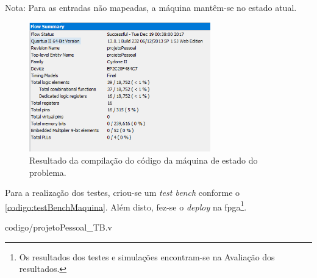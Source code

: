 		
		Nota: Para as entradas não mapeadas, a máquina mantêm-se no estado atual.

		\begin{figure}[H]
			 \centering
			 \caption{\label{figura:compilacaoMaquina}Resultado da compilação do código da máquina de
			  estado do problema.}
			 \includegraphics[width=0.7\textwidth]{img/compilacao}
		\end{figure}

		Para a realização dos testes, criou-se um \textit{test bench} conforme o \autoref{codigo:testBenchMaquina}.
		Além disto, fez-se o \textit{deploy} na \ac{fpga}\footnote{Os resultados dos
		 testes e simulações encontram-se na Avaliação dos resultados.}.

		
		{codigo/projetoPessoal_TB.v}




